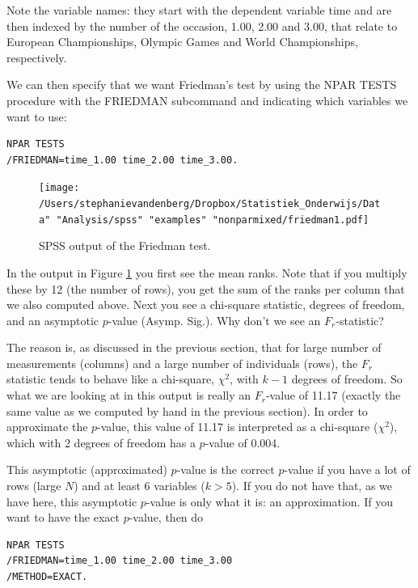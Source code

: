 \documentclass[]{book}\usepackage[]{graphicx}\usepackage[]{color}
\begin{document}
Note the variable names: they start with the dependent variable time and are then indexed by the number of the occasion, 1.00, 2.00 and 3.00, that relate to European Championships, Olympic Games and World Championships, respectively.

We can then specify that we want Friedman's test by using the NPAR TESTS procedure with the FRIEDMAN subcommand and indicating which variables we want to use:

\begin{verbatim}
NPAR TESTS
/FRIEDMAN=time_1.00 time_2.00 time_3.00.
\end{verbatim}

\begin{figure}[h]
    \begin{center}
       \texttt{[image: /Users/stephanievandenberg/Dropbox/Statistiek\_Onderwijs/Data" "Analysis/spss" "examples" "nonparmixed/friedman1.pdf]}
    \end{center}
     \caption{SPSS output of the Friedman test.}
    \label{fig:friedman1}
\end{figure}


In the output in Figure \ref{fig:friedman1} you first see the mean ranks. Note that if you multiply these by 12 (the number of rows), you get the sum of the ranks per column that we also computed above. Next you see a chi-square statistic, degrees of freedom, and an asymptotic $p$-value (Asymp. Sig.). Why don't we see an $F_r$-statistic?

The reason is, as discussed in the previous section, that for large number of measurements (columns) and a large number of individuals (rows), the $F_r$ statistic tends to behave like a chi-square, $\chi^2$, with $k-1$ degrees of freedom. So what we are looking at in this output is really an $F_r$-value of 11.17 (exactly the same value as we computed by hand in the previous section). In order to approximate the $p$-value, this value of 11.17 is interpreted as a chi-square ($\chi^2$), which with 2 degrees of freedom has a $p$-value of 0.004.


This asymptotic (approximated) $p$-value is the correct $p$-value if you have a lot of rows (large $N$) and at least 6 variables ($k>5$). If you do not have that, as we have here, this asymptotic $p$-value is only what it is: an approximation. If you want to have the exact $p$-value, then do

\begin{verbatim}
NPAR TESTS
/FRIEDMAN=time_1.00 time_2.00 time_3.00
/METHOD=EXACT.
\end{verbatim}
\end{document}
